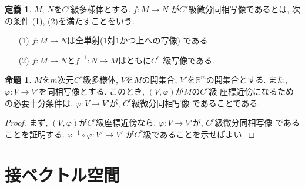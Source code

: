 \documentclass[a4j,12pt]{jarticle}
\theoremstyle{definition}
\newtheorem{definition}[theorem]{定義}
\newtheorem{proposition}[theorem]{命題}
\begin{document}
\begin{definition}\label{def:C^s deffeomorphism}
    $M$, $N$を$C^r$級多様体とする. $f:M\to N$
    が$C^s$級微分同相写像であるとは, 次の条件
    (1), (2)を満たすことをいう. 
    \begin{itemize}
        \item[(1)]
        $f:M\to N$は全単射($1$対$1$かつ上への写像)
        である. 
        \item[(2)] 
        $f:M\to N$と$f^{-1}:N\to M$はともに$C^s$
        級写像である. 
    \end{itemize}
\end{definition}
\begin{proposition}\label{prop: cord-nabor condition}
    $M$を$m$次元$C^r$級多様体, $V$を$M$の開集合, 
    $V'$を$\mathbb{R}^m$の開集合とする. また, 
    $\varphi:V\to V'$を同相写像とする. 
    このとき, $(V,\varphi)$が$M$の$C^r$級
    座標近傍になるための必要十分条件は, 
    $\varphi:V\to V'$が, $C^r$級微分同相写像
    であることである. 
\end{proposition}
\begin{proof}
    まず, $(V,\varphi)$が$C^r$級座標近傍なら, 
    $\varphi:V\to V'$が, $C^r$級微分同相写像
    であることを証明する. 
    $\varphi ^{-1}\circ\varphi:V'\to V'$
    が$C^r$級であることを示せばよい.  

\end{proof}
%
\section{接ベクトル空間}
\end{document}
